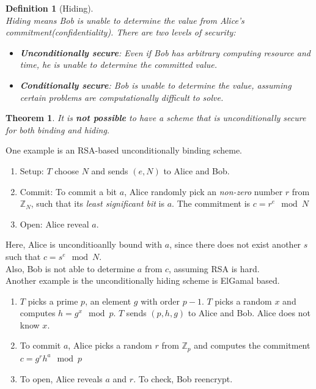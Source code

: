 \documentclass[12pt]{article}
\newtheorem{definition}{Definition}[section]
\newtheorem{theorem}{Theorem}[section]
\theoremstyle{definition}
\begin{document}
\begin{definition}[Hiding]
\hfill\\\normalfont Hiding means Bob is unable to determine the value from Alice's commitment(confidentiality).
There are two levels of security:
\begin{itemize}
  \item \textbf{Unconditionally secure}: Even if Bob has arbitrary computing resource and time, he is unable to determine the committed value.
  \item \textbf{Conditionally secure}: Bob is unable to determine the value, assuming certain problems are computationally difficult to solve.
\end{itemize}
\end{definition}
\begin{theorem}\normalfont It is \textbf{not possible} to have a scheme that is unconditionally secure for both binding and hiding.\end{theorem}
One example is an RSA-based unconditionally binding scheme.\\
\begin{enumerate}
  \item Setup: $T$ choose $N$ and sends $(e,N)$ to Alice and Bob.
  \item Commit: To commit a bit $a$, Alice randomly pick an \textit{non-zero} number $r$ from $\mathbb{Z}_N$, such that its \textit{least significant bit} is $a$. The commitment is
  $
c=r^e\mod N
  $
  \item Open: Alice reveal $a$.
\end{enumerate}
Here, Alice is unconditioanlly bound with $a$, since there does not exist another $s$ such that $c=s^e\mod N$.\\
Also, Bob is not able to determine $a$ from $c$, assuming RSA is hard. \\
Another example is the unconditionally hiding scheme is ElGamal based.\\
\begin{enumerate}
  \item $T$ picks a prime $p$, an element $g$ with order $p-1$. $T$ picks a random $x$ and computes $h=g^x\mod p$. $T$ sends $(p,h,g)$ to Alice and Bob. Alice does not know $x$.
  \item To commit $a$, Alice picks a random $r$ from $\mathbb{Z}_p$ and computes the commitment
  $
c=g^rh^a\mod p
  $
  \item To open, Alice reveals $a$ and $r$. To check, Bob reencrypt.
\end{enumerate}
\end{document}
